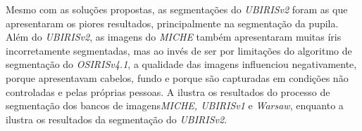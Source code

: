 \par Mesmo com as soluções propostas, as segmentações do \textit{UBIRISv2} foram as que apresentaram os piores resultados, principalmente na segmentação da pupila. Além do \textit{UBIRISv2}, as imagens do \textit{MICHE} também apresentaram muitas íris incorretamente segmentadas, mas ao invés de ser por limitações do algoritmo de segmentação do \textit{OSIRISv4.1}, a qualidade das imagens influenciou negativamente, porque apresentavam cabelos, fundo e porque são capturadas em condições não controladas e pelas próprias pessoas. A  ilustra os resultados do processo de segmentação dos bancos de imagens\textit{MICHE, UBIRISv1} e \textit{\acrshort{Warsaw}}, enquanto a  ilustra os resultados da segmentação do \textit{UBIRISv2}.

